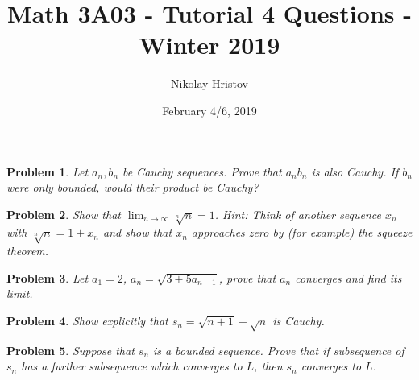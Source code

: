 \documentclass[11pt]{article}
\theoremstyle{plain}
\newtheorem{problem}{Problem}
\theoremstyle{remark}
\begin{document}
	\title{Math 3A03 - Tutorial 4 Questions - Winter 2019}
	\author{Nikolay Hristov}
	\date{February 4/6, 2019}
	\maketitle
	
	\begin{problem}
		Let $a_n,b_n$ be Cauchy sequences. Prove that $a_nb_n$ is also Cauchy. If $b_n$ were only bounded, would their product be Cauchy?
	\end{problem}


	\begin{problem}
		Show that $\displaystyle{\lim_{n \to \infty}} \sqrt[n]{n} = 1$. Hint: Think of another sequence $x_n$ with $ \sqrt[n]{n}=1+x_n$ and show that $x_n$ approaches zero by (for example) the squeeze theorem.
	\end{problem}

	\begin{problem}
		Let $a_1=2$, $a_n=\sqrt{3+5a_{n-1}}$, prove that $a_n$ converges and find its limit.
	\end{problem}
	
	\begin{problem}
		Show explicitly that $s_n=\sqrt{n+1}-\sqrt{n}$ is Cauchy.
	\end{problem}

\begin{problem}
	Suppose that $s_n$ is a bounded sequence. Prove that if subsequence of $s_n$ has a further subsequence which converges to $L$, then $s_n$ converges to $L$. 
\end{problem}
	
\end{document}
